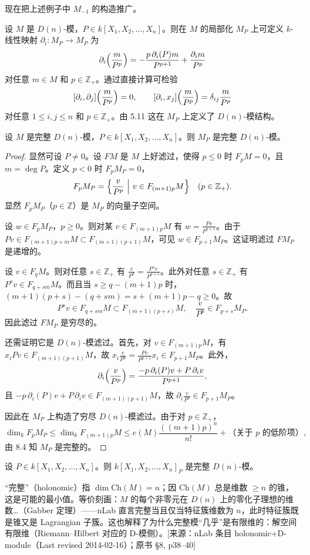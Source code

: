 现在把上述例子中 $M_{-1}$ 的构造推广。

设 $M$ 是 $D(n)$-模，$P\in k[X_1,X_2,\dots,X_n]$。则在 $M$ 的局部化 $M_P$ 上可定义 $k$-线性映射 $\partial_i:M_P\to M_P$ 为
$$\partial_i\Bigl(\frac{m}{P^p}\Bigr)=-\frac{p\,\partial_i(P)m}{P^{p+1}}+\frac{\partial_i m}{P^p}$$
对任意 $m\in M$ 和 $p\in\mathbb{Z}_+$。通过直接计算可检验
$$[\partial_i,\partial_j]\Bigl(\frac{m}{P^p}\Bigr)=0,\qquad [\partial_i,x_j]\Bigl(\frac{m}{P^p}\Bigr)=\delta_{ij}\frac{m}{P^p}$$
对任意 $1\le i,j\le n$ 和 $p\in\mathbb{Z}_+$。由 5.11 这在 $M_P$ 上定义了 $D(n)$-模结构。

\begin{proposition}
设 $M$ 是完整 $D(n)$-模，$P\in k[X_1,X_2,\dots,X_n]$。则 $M_P$ 是完整 $D(n)$-模。
\end{proposition}

\begin{proof}
显然可设 $P\neq 0$。设 $F M$ 是 $M$ 上好滤过，使得 $p\le 0$ 时 $F_pM=0$，且 $m=\deg P$。定义 $p<0$ 时 $F_pM_P=0$，
$$F_pM_P=\Bigl\{\frac{v}{P^p}\ \Big|\ v\in F_{(m+1)p}M\Bigr\}\quad(p\in\mathbb{Z}_+).$$
显然 $F_pM_P$（$p\in\mathbb{Z}$）是 $M_P$ 的向量子空间。

设 $w\in F_pM_P$，$p\ge 0$。则对某 $v\in F_{(m+1)p}M$ 有 $w=\frac{Pv}{P^{p+1}}$。由于 $Pv\in F_{(m+1)p+m}M\subset F_{(m+1)(p+1)}M$，可见 $w\in F_{p+1}M_P$。这证明滤过 $F M_P$ 是递增的。

设 $v\in F_qM$。则对任意 $s\in\mathbb{Z}_+$ 有 $\frac{v}{P^p}=\frac{P^sv}{P^{p+s}}$。此外对任意 $s\in\mathbb{Z}_+$ 有 $P^sv\in F_{q+sm}M$。而且当 $s\ge q-(m+1)p$ 时，$(m+1)(p+s)-(q+sm)=s+(m+1)p-q\ge 0$。故
$$P^sv\in F_{q+sm}M\subset F_{(m+1)(p+s)}M,\quad \frac{v}{P^p}\in F_{p+s}M_P.$$
因此滤过 $F M_P$ 是穷尽的。

还需证明它是 $D(n)$-模滤过。首先，对 $v\in F_{(m+1)p}M$，有 $x_iPv\in F_{(m+1)(p+1)}M$，故 $x_i\frac{v}{P^p}=\frac{Pv}{P^{p+1}}x_i\in F_{p+1}M_P$。此外，
$$\partial_i\Bigl(\frac{v}{P^p}\Bigr)=\frac{-p\,\partial_i(P)v+P\,\partial_i v}{P^{p+1}},$$
且 $-p\,\partial_i(P)v+P\,\partial_i v\in F_{(m+1)(p+1)}M$，故 $\partial_i\frac{v}{P^p}\in F_{p+1}M_P$。

因此在 $M_P$ 上构造了穷尽 $D(n)$-模滤过。由于对 $p\in\mathbb{Z}_+$，
$$\dim_k F_pM_P\le\dim_k F_{(m+1)p}M\le e(M)\frac{((m+1)p)^n}{n!}+\text{（关于 $p$ 的低阶项）},$$
由 8.4 知 $M_P$ 是完整的。
\end{proof}

\begin{corollary}
设 $P\in k[X_1,X_2,\dots,X_n]$。则 $k[X_1,X_2,\dots,X_n]_P$ 是完整 $D(n)$-模。
\end{corollary}
\begin{annote}
“完整”（holonomic）指 $\dim\mathrm{Ch}(M)=n$；因 $\mathrm{Ch}(M)$ 总是维数 $\ge n$ 的锥，这是可能的最小值。等价刻画：$M$ 的每个非零元在 $D(n)$ 上的零化子理想的维数…（Gabber 定理）——nLab 直言完整当且仅当特征簇维数为 $n$，此时特征簇既是锥又是 Lagrangian 子簇。这也解释了为什么完整模“几乎”是有限维的：解空间有限维（Riemann–Hilbert 对应的 D-模侧）。[来源：nLab 条目 holonomic+D-module（Last revised 2014-02-16）；原书 §8, p38–40]
\end{annote}



